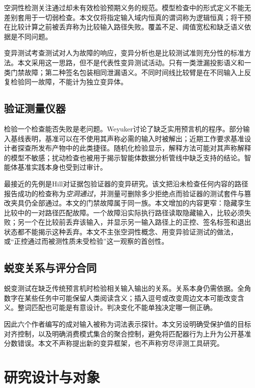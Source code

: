 \documentclass[UTF8,11pt]{ctexart}
\begin{document}
空洞性检测关注通过却未有效检验预期义务的规范\cite{beer,kupferman}。模型检查中的形式定义不能无差别套用于一切弱检查。本文仅将指定输入域内恒真的谓词称为逻辑恒真；将干预在比较计算之前被丢弃称为比较输入路径失败。覆盖不足、阈值宽松和缺乏语义依据是不同问题。

变异测试考查测试对人为故障的响应\cite{jia}，变异分析也是比较测试准则充分性的标准方法\cite{andrews}。本文采用这一思路，但不是代表性变异测试活动。只有一类泄漏投影语义和一类门禁故障；第二种签名包装相同泄漏语义。不同时间线比较臂是在不同输入上反复检验同一故障，不能计为独立变异体。

\subsection{验证测量仪器}
检验一个检查能否失败是老问题。Weyuker讨论了缺乏实用预言机的程序\cite{weyuker}。部分输入基线表明，基准可以在不使用其声称必需的输入时被解出\cite{poliak}；近期工作要求基准设计者探查所发布产物中的此类捷径\cite{brown}。随机化检验显示，解释方法可能对其声称解释的模型不敏感\cite{adebayo}；扰动检查也被用于揭示智能体数据分析管线中缺乏支持的结论\cite{rewolinski}。智能体基准实践本身也受到过审计\cite{kapoor}。

最接近的先例是Hill对证据包验证器的变异研究\cite{hill}。该文把沿未检查任何内容的路径报告成功的检查称为\emph{空洞通过}，并测量可删除多少拒绝点而验证器的测试套件与篡改夹具仍全部通过。本文的门禁故障属于同一族。本文增加的内容更窄：隐藏孪生比较中的一对路径匹配故障。一个故障沿实际执行路径读取隐藏输入，比较必须失败；另一个在比较前丢弃该输入，并显示另一输入路径上的正控、签名标签和退出状态都不能揭示这种丢弃。本文不主张空洞性概念、用变异验证测试的做法，或“正控通过而被测性质未受检验”这一观察的首创性。

\subsection{蜕变关系与评分合同}
蜕变测试在缺乏传统预言机时检验相关输入输出的关系\cite{segura,chen}。关系本身仍需依据。全角数字在某些任务中可能保留人类阅读含义；插入逗号或改变周边文本可能改变含义。整词匹配也可能是有意设计。判决变化不能单独决定哪一侧正确。

因此六个作者编写的成对输入被称为词法表示探针。本文另设明确受保护值的目标对齐控制，以及明确消费模式集合的聚合控制，避免将匹配器行为上升为公开基准分数错误。本文不声称提出新的变异框架，也不声称穷尽评测工具研究。

\section{研究设计与对象}
\end{document}
